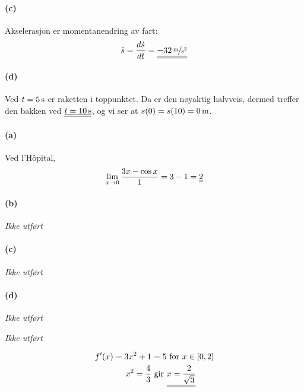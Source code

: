 \documentclass[a4paper,norsk,12pt]{article}
\begin{document}
\paragraph{(c)}
Akselerasjon er momentanendring av fart:
\begin{align*}
  \ddot{s} = \frac{d\dot{s}}{dt} = \svar{\unitfrac[-32]{m}{s^2}}
\end{align*}

\paragraph{(d)}
Ved $t=\unit[5]{s}$ er raketten i toppunktet. Da er den nøyaktig halvveis,
dermed treffer den bakken ved $\svar{t=\unit[10]{s}}$, og vi ser at
$s(0) = s(10) = \unit[0]{m}$.

\paragraph{(a)}
Ved l'Hôpital,
\begin{align*}
  \lim_{x\to 0}{\frac{3x-\cos{x}}{1}} = 3 - 1 = {\underline{\underline{2}}}
\end{align*}

\paragraph{(b)}
\textit{Ikke utført}
\paragraph{(c)}
\textit{Ikke utført}
\paragraph{(d)}
\textit{Ikke utført}

\textit{Ikke utført}

\begin{align*}
  f'(x) = 3x^2 + 1 & = 5 \text{ for } x \in [0,2]\\
  x^2 = \frac{4}{3} & \text{ gir }
  \svar{x = \frac{2}{\sqrt{3}}}
\end{align*}
\end{document}
